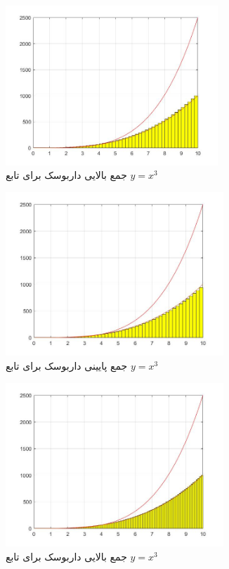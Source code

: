 \documentclass{article}
\begin{document}
\begin{figure}[!h]
    \centering
\includegraphics[width=8cm]{pic14codeIntegral.jpg}
    \caption{جمع بالایی داربوسک برای تابع $y=x^3$}
    \label{fig:انتگرال خط}
\end{figure}

\begin{figure}[!h]
    \centering
\includegraphics[width=8.2cm]{pic13codeIntegral.jpg}
    \caption{جمع پایینی داربوسک برای تابع $y=x^3$}
    \label{fig:انتگرال خط}
\end{figure}

\begin{figure}[!h]
    \centering
\includegraphics[width=8.2cm]{pic15codeIntegral.jpg}
    \caption{جمع بالایی داربوسک برای تابع $y=x^3$}
    \label{fig:انتگرال خط}
\end{figure}
\end{document}
